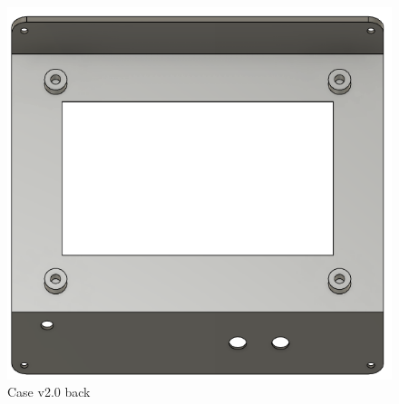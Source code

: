 \begin{figure}[H]
\begin{minipage}{0.45\textwidth}
    \includegraphics[width=\textwidth]{assets/Deckel v2.0_Rueckseite.png}
    \caption{Case v2.0 back}
  \end{minipage}
\end{figure}
